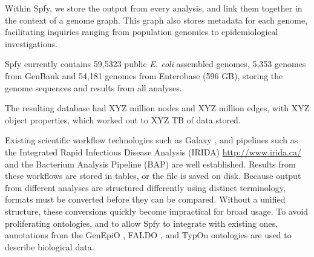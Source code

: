 Within Spfy, we store the output from every analysis, and link them together in the context of a genome graph. This graph also stores metadata for each genome, facilitating inquiries ranging from population genomics to epidemiological investigations.

Spfy currently contains 59,5323 public \textit{E. coli} assembled genomes, 5,353 genomes from GenBank and 54,181 genomes from Enterobase (\~596 GB), storing the genome sequences and results from all analyses.

The resulting database had XYZ million nodes and XYZ million edges, with XYZ object properties, which worked out to XYZ TB of data stored.


Existing scientific workflow technologies such as Galaxy \citep{goecks2010galaxy}, and pipelines such as the Integrated Rapid Infectious Disease Analysis (IRIDA) \url{http://www.irida.ca/} and the Bacterium Analysis Pipeline (BAP) \citep{thomsen2016bacterial} are well established.
Results from these workflows are stored in tables, or the file is saved on disk.
Because output from different analyses are structured differently using distinct terminology, formats must be converted before they can be compared. Without a unified structure, these conversions quickly become impractical for broad usage.
To avoid proliferating ontologies, and to allow Spfy to integrate with existing ones, annotations from the GenEpiO \citep{griffiths2017context}, FALDO \citep{bolleman2016faldo}, and TypOn \citep{vaz2014typon} ontologies are used to describe biological data.


